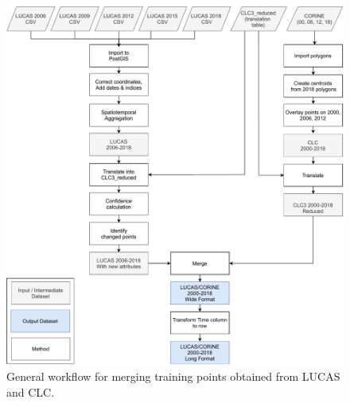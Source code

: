     
    
    \begin{figure}[!hp]
    \centering
    \includegraphics[width=\textwidth]{figs_03/methods_lucas_corine_workflow.pdf}
    \caption{General workflow for merging training points obtained from LUCAS and CLC.} \label{fig:tp_workflow}
    \end{figure}
    

